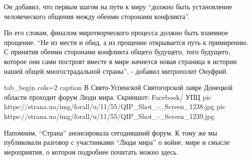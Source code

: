 Он добавил, что первым шагом на пути к миру \enquote{должно быть установление
человеческого общения между обеими сторонами конфликта}.

По его словам, финалом миротворческого процесса должно быть взаимное
прощение. \enquote{Не из мести и обид, а из прощение открывается путь к
примирению. С принятия обеими сторонами конфликта общего будущего, того
будущего, которое они сами построят вместе в мире начнется новая страница
в истории нашей общей многострадальной страны}, - добавил  митрополит
Онуфрий.

\ifcmt
tab_begin cols=2
	caption В Свято-Успенской Святогорской лавре Донецкой области проходит форум Люди мира. Скриншот: Facebook/ УПЦ
	pic https://strana.ua/img/forall/u/11/55/QIP_Shot_-_Screen_1238.jpg
	pic https://strana.ua/img/forall/u/11/55/QIP_Shot_-_Screen_1239.jpg
\fi

Напомним, \enquote{Страна} анонсировала сегодняшний форум. К тому же мы
публиковали разговор с участниками \enquote{Люди мира} о войне, мире и смысле
мероприятия, о котором подробнее почитать можно
здесь.

